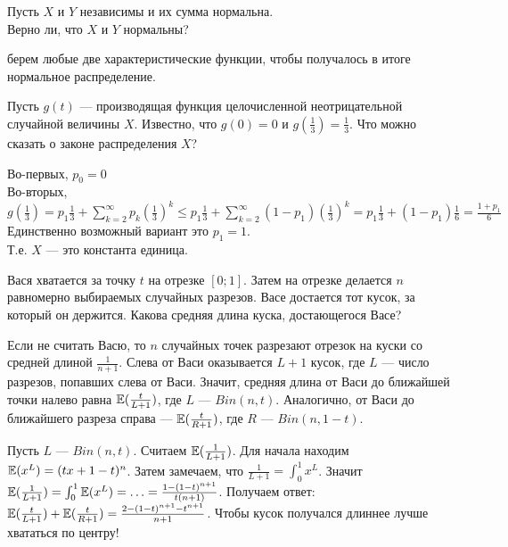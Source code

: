 \begin{problem}
Пусть $X$ и $Y$ независимы и их сумма нормальна. \\
Верно ли, что $X$ и $Y$ нормальны?

\begin{sol}
 берем любые две характеристические функции, чтобы получалось в итоге нормальное распределение.
\end{sol}
\end{problem}

\begin{problem}
Пусть $g(t)$ — производящая функция целочисленной неотрицательной случайной величины $X$. Известно, что $g(0)=0$ и $g(\frac{1}{3})=\frac{1}{3}$. Что можно сказать о законе распределения $X$?

\begin{sol}

Во-первых, $p_{0}=0$ \\
Во-вторых, $g(\frac{1}{3})=p_{1}\frac{1}{3}+\sum_{k=2}^{\infty}p_{k}\left(\frac{1}{3}\right)^{k}\le p_{1}\frac{1}{3}+\sum_{k=2}^{\infty}(1-p_{1})\left(\frac{1}{3}\right)^{k}=p_{1}\frac{1}{3}+(1-p_{1})\frac{1}{6}=\frac{1+p_{1}}{6}$ \\
Единственно возможный вариант это $p_{1}=1$. \\
Т.е. $X$ — это константа единица.
\end{sol}
\end{problem}

\begin{problem}
Вася хватается за точку $t$ на отрезке $[0;1]$. Затем на отрезке делается $n$ равномерно выбираемых случайных разрезов.
Васе достается тот кусок, за который он держится. Какова средняя длина куска, достающегося Васе?

\begin{sol}

Если не считать Васю, то $n$ случайных точек разрезают отрезок на куски со средней длиной $\frac{1}{n+1}$.
Слева от Васи оказывается $L+1$ кусок, где $L$ — число разрезов, попавших слева от Васи. Значит, средняя длина от Васи до ближайшей точки налево равна
$\mathbb{E}(\frac{t}{L+1})$, где $L$ — $Bin(n,t)$. Аналогично, от Васи до ближайшего разреза справа — $\mathbb{E}(\frac{t}{R+1})$, где $R$ — $Bin(n,1-t)$.

Пусть $L$ — $Bin(n,t)$. Считаем $\mathbb{E}(\frac{1}{L+1})$. Для начала находим $\mathbb{E}(x^{L})=(tx+1-t)^{n}$.
Затем замечаем, что $\frac{1}{L+1}=\int_{0}^{1}x^{L}$. Значит $\mathbb{E}(\frac{1}{L+1})=\int_{0}^{1}\mathbb{E}(x^{L})=\ldots=\frac{1-(1-t)^{n+1}}{t(n+1)}$.
Получаем ответ: $\mathbb{E}(\frac{t}{L+1})+\mathbb{E}(\frac{t}{R+1})=\frac{2-(1-t)^{n+1}-t^{n+1}}{n+1}$.
Чтобы кусок получался длиннее лучше хвататься по центру!
\end{sol}
\end{problem}




